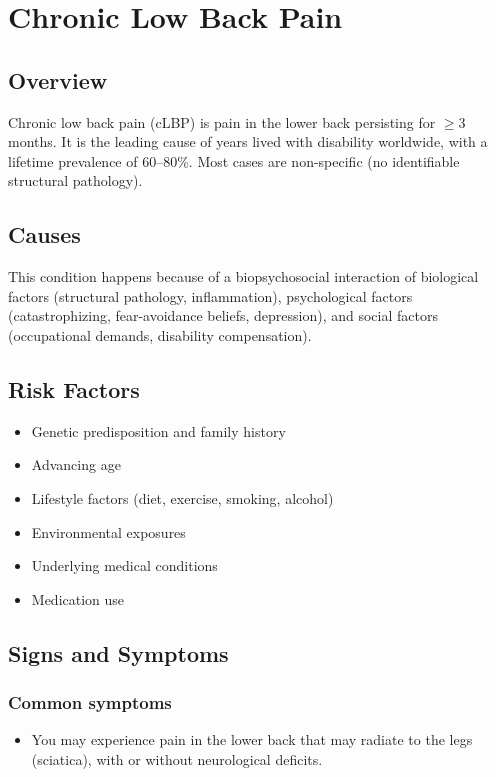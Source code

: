 \chapter{Chronic Low Back Pain}
\label{sec:Chronic Low Back Pain}

\section{Overview}
Chronic low back pain (cLBP) is pain in the lower back persisting for $\ge$3 months. It is the leading cause of years lived with disability worldwide, with a lifetime prevalence of 60--80\%. Most cases are non-specific (no identifiable structural pathology).
\section{Causes}
This condition happens because of a biopsychosocial interaction of biological factors (structural pathology, inflammation), psychological factors (catastrophizing, fear-avoidance beliefs, depression), and social factors (occupational demands, disability compensation).     
\section{Risk Factors}

\begin{itemize}[noitemsep]
  \item Genetic predisposition and family history
  \item Advancing age
  \item Lifestyle factors (diet, exercise, smoking, alcohol)
  \item Environmental exposures
  \item Underlying medical conditions
  \item Medication use
\end{itemize}
\section{Signs and Symptoms}

\subsection{Common symptoms}
\begin{itemize}[noitemsep]
  \item You may experience pain in the lower back that may radiate to the legs (sciatica), with or without neurological deficits. 
  \end{itemize}

